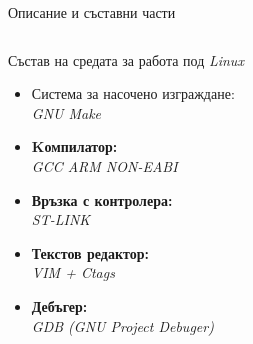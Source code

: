 \documentclass[handout]{beamer}
\begin{document}
\begin{frame}{Описание и съставни части}
	\begin{columns}
		\begin{block}{ Състав на средата за работа под \textit{Linux}}
			\begin{itemize}
				\pause
				\item Система за насочено изграждане: \\ \textit{GNU Make}

				\pause
				\item \textbf{Kомпилатор:} \\ \textit{GCC ARM NON-EABI}

				\pause
				\item \textbf{Връзка с контролера:} \\ \textit{ST-LINK}

				\pause
				\item \textbf{Текстов редактор:} \\\textit{VIM + Ctags}

				\pause 
				\item \textbf{Дебъгер:} \\ \textit{GDB (GNU Project Debuger)} 


\end{itemize}
\end{block}
\end{columns}
\end{frame}
\end{document}

